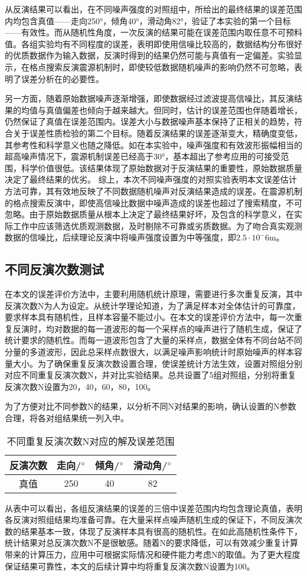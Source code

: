 从反演结果可以看出，在不同噪声强度的对照组中，所给出的最终结果的误差范围内均包含真值——走向250°，倾角40°，滑动角82°，验证了本实验的第一个目标——有效性。而从随机性角度，一次反演的结果可能在误差范围内取任意不可预料值。各组实验均有不同程度的误差，表明即使用信噪比较高的，数据结构分布很好的优质数据作为输入数据，反演时得到的结果仍然可能与真值有一定偏差。实验显示，在格点搜索反演震源机制时，即使较低数据随机噪声的影响仍然不可忽略，表明了误差分析在的必要性。

另一方面，随着原始数据噪声逐渐增强，即使数据经过滤波提高信噪比，其反演结果的均值与真值偏差也倾向于越来越大。但同时，估计的误差范围也伴随着增长，仍然保证了真值在误差范围内。误差大小与数据噪声基本保持了正相关的趋势，符合关于误差性质检验的第二个目标。随着反演结果的误差逐渐变大，精确度变低，其参考性和科学意义也随之降低。如在本实验中，噪声强度和有效波形振幅相当的超高噪声情况下，震源机制误差已经高于30°，基本超出了参考应用的可接受范围，科学价值很低。该结果体现了原始数据对于反演结果的重要性，原始数据质量决定了最终结果的优劣。 综上，本次不同噪声强度的对照实验表明本文误差估计方法可靠，其有效地反映了不同数据随机噪声对反演结果造成的误差。在震源机制的格点搜索反演中，即使高信噪比数据中噪声造成的误差也超过了搜索精度，不可忽略。由于原始数据质量从根本上决定了最终结果好坏，及包含的科学意义，在实际工作中应该筛选优质观测数据，及时剔除不可靠或劣质数据。为了吻合真实观测数据的信噪比，后续理论反演中将噪声强度设置为中等强度，即$2.5\cdot10^-{6}$m。

\subsection{不同反演次数测试}
在本文的误差评价方法中，主要利用随机统计原理，需要进行多次重复反演，其中反演次数N为人为设定。从统计学理论知道，为了满足样本对全体估计的可靠度，要求样本具有随机性，且样本容量不能过小。在本文的误差评价方法中，每一次重复反演时，均对数据的每一道波形的每一个采样点的噪声进行了随机生成，保证了统计要求的随机性。而每一道波形包含了大量的采样点，数据全体有不同台站不同分量的多道波形，因此总采样点数很大，以满足噪声影响统计时原始噪声的样本容量大小。为了确保重复反演次数设置合理，使误差统计方法生效，设置对照组分别对应不同重复反演次数N，并对比实验结果。总共设置了5组对照组，分别将重复反演次数N设置为20，40，60，80，100。

为了方便对比不同参数N的结果，以分析不同N对结果的影响，确认设置的N参数合理，将各对组结果统一列入中。
\begin{table}[ht]
\centering
\caption{不同重复反演次数N对应的解及误差范围}
\label{tab3_07}
    \begin{tabular}{c c c c}
    \hline
    反演次数 & 走向/$^\circ$ & 倾角/$^\circ$ & 滑动角/$^\circ$ \\
    \hline
    真值		& 250 & 40 & 82  \\
    \hline
    \end{tabular}
\end{table}

从表中可以看出，各组反演结果的误差的三倍中误差范围内均包含理论真值，表明各反演对照组结果均准备可靠。在大量采样点噪声随机生成的保证下，不同反演次数的结果基本一致，体现了反演样本具有很高的随机性。在如此高随机性条件下，统计结果对总反演次数N不是很敏感。随着N的要求降低，可以有效减少重复计算带来的计算压力，应用中可根据实际情况和硬件能力考虑N的取值。为了更大程度保证结果可靠性，本文的后续计算中均将重复反演次数N设置为100。

